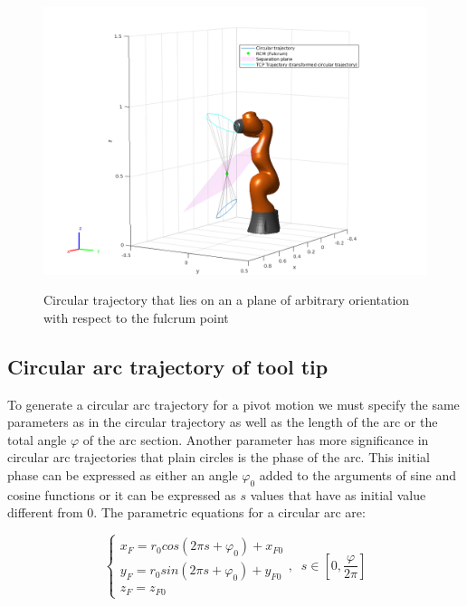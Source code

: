 \begin{center}
\begin{figure}[!htb]
\centering
\includegraphics[width=\textwidth]{images/rcm_trajectories/robot-pose-random-rcm-circle-traj.png}\\
\caption{Circular trajectory that lies on an a plane of arbitrary orientation with respect to the fulcrum point}
\end{figure}
\end{center}


\subsection{Circular arc trajectory of tool tip}

To generate a circular arc trajectory for a pivot motion we must specify the same parameters as 
in the circular trajectory as well as the length of the arc or the total angle $φ$ of the arc 
section. Another parameter has more significance in circular arc trajectories that plain circles is the phase of the arc. This initial phase can be expressed as either an angle $φ_0$ added to the arguments of 
sine and cosine functions or it can be expressed as $s$ values that have as initial value different from $0$. The parametric equations for a circular arc are:

\begin{equation}
\begin{cases}
x^{}_{F} = r_0cos(2πs + φ_0) + x^{}_{F0} \\
y^{}_{F} = r_0sin(2πs + φ_0) + y^{}_{F0} \\
z^{}_{F} = z^{}_{F0}
\end{cases} ,
\;\;
s \in \left[ 0, \frac{φ}{2π} \right]
\end{equation}


